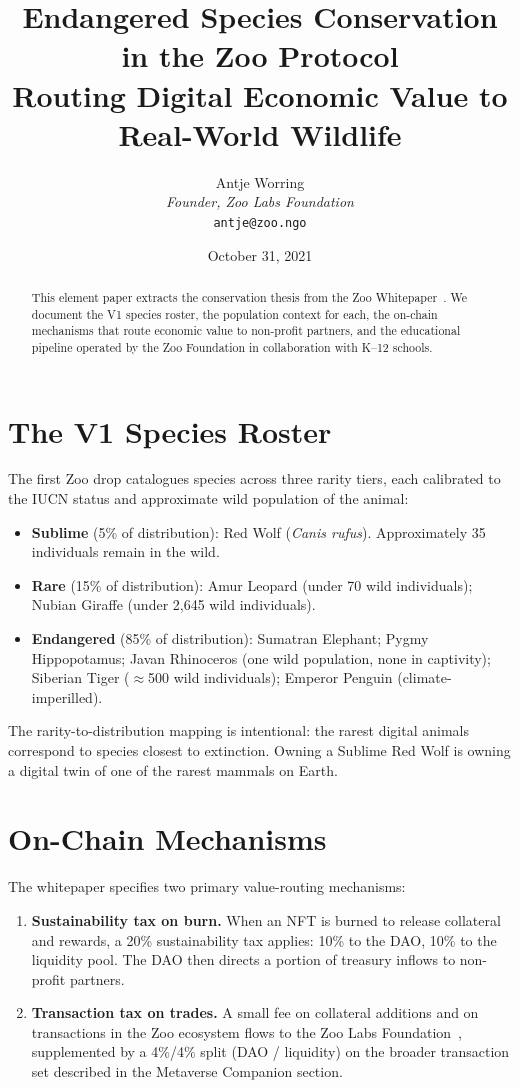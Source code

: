 \documentclass[11pt,letterpaper]{article}
\title{\textbf{Endangered Species Conservation in the Zoo Protocol}\\\large Routing Digital Economic Value to Real-World Wildlife}
\author{Antje Worring \\ \textit{Founder, Zoo Labs Foundation} \\ \texttt{antje@zoo.ngo}}
\date{October 31, 2021}
\begin{document}
\maketitle

\begin{abstract}
This element paper extracts the conservation thesis from the Zoo Whitepaper~\cite{zoo2021}. We document the V1 species roster, the population context for each, the on-chain mechanisms that route economic value to non-profit partners, and the educational pipeline operated by the Zoo Foundation in collaboration with K--12 schools.
\end{abstract}

\section{The V1 Species Roster}

The first Zoo drop catalogues species across three rarity tiers, each calibrated to the IUCN status and approximate wild population of the animal:

\begin{itemize}
  \item \textbf{Sublime} (5\% of distribution): Red Wolf (\textit{Canis rufus}). Approximately 35 individuals remain in the wild.
  \item \textbf{Rare} (15\% of distribution): Amur Leopard (under 70 wild individuals); Nubian Giraffe (under 2{,}645 wild individuals).
  \item \textbf{Endangered} (85\% of distribution): Sumatran Elephant; Pygmy Hippopotamus; Javan Rhinoceros (one wild population, none in captivity); Siberian Tiger ($\approx$500 wild individuals); Emperor Penguin (climate-imperilled).
\end{itemize}

The rarity-to-distribution mapping is intentional: the rarest digital animals correspond to species closest to extinction. Owning a Sublime Red Wolf is owning a digital twin of one of the rarest mammals on Earth.

\section{On-Chain Mechanisms}

The whitepaper specifies two primary value-routing mechanisms:

\begin{enumerate}
  \item \textbf{Sustainability tax on burn.} When an NFT is burned to release collateral and rewards, a 20\% sustainability tax applies: 10\% to the DAO, 10\% to the liquidity pool. The DAO then directs a portion of treasury inflows to non-profit partners.
  \item \textbf{Transaction tax on trades.} A small fee on collateral additions and on transactions in the Zoo ecosystem flows to the Zoo Labs Foundation~\cite{zoo2021}, supplemented by a 4\%/4\% split (DAO / liquidity) on the broader transaction set described in the Metaverse Companion section.
\end{enumerate}
\end{document}

